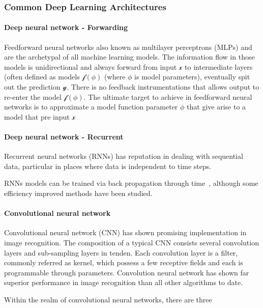 \subsubsection{Common Deep Learning Architectures}

\paragraph{Deep neural network - Forwarding}
Feedforward neural networks also known as multilayer perceptrons (MLPs) and are the archetypal of all machine learning models. The information flow in those models is unidirectional and always forward from input $\mathcal{x}$ to intermediate layers (often defined as models $\mathcal{f}(\phi)$ (where $\phi$ is model parameters), eventually spit out the prediction $\mathcal{y}$. There is no feedback instrumentations that allows output to re-enter the model $\mathcal{f}(\phi)$. The ultimate target to achieve in feedforward neural networks is to approximate a model function parameter $\phi$ that give arise to a model that pre input $\mathcal{x}$ 

\paragraph{Deep neural network - Recurrent}
Recurrent neural networks (RNNs) has reputation in dealing with sequential data, particular in places where data is independent to time steps. 

RNNs models can be trained via back propagation through time~\cite{Goodfellow-et-al-2016}, although some efficiency improved methods have been studied.~\cite{963769,neco.1989,Gomez:2008:ANE:1390681.1390712}

\paragraph{Convolutional neural network}
Convolutional neural network (CNN) has shown promising implementation in image recognition. The composition of a typical CNN consists several convolution layers and sub-sampling layers in tenden. Each convolution layer is a filter, commonly referred as kernel, which possess a few receptive fields and each is programmable through parameters.  
Convolution neural network has shown far superior performance in image recognition than all other algorithms to date.~\cite{Szegedy_2015}
\par 
Within the realm of convolutional neural networks, there are three